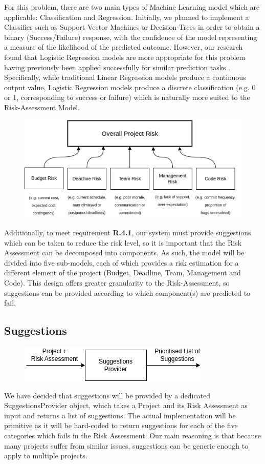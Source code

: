 \documentclass[a4paper]{article}
\theoremstyle{plain}
\theoremstyle{definition}
\theoremstyle{remark}
\begin{document}
\noindent For this problem, there are two main types of Machine Learning model which are applicable: Classification and Regression. Initially, we planned to implement a Classifier such as Support Vector Machines or Decision-Trees in order to obtain a binary (Success/Failure) response, with the confidence of the model representing a measure of the likelihood of the predicted outcome. However, our research found that Logistic Regression models are more appropriate for this problem having previously been applied successfully for similar prediction tasks \cite{billy}. Specifically, while traditional Linear Regression models produce a continuous output value, Logistic Regression models produce a discrete classification (e.g. 0 or 1, corresponding to success or failure) \cite{kanade_2022} which is naturally more suited to the Risk-Assessment Model. \\
\begin{figure}
\includegraphics[width=0.9\linewidth]{cr.png} 	
\end{figure}
Additionally, to meet requirement \textbf{R.4.1}, our system must provide suggestions which can be taken to reduce the risk level, so it is important that the Risk Assessment can be decomposed into components. As such, the model will be divided into five sub-models, each of which provides a risk estimation for a different element of the project (Budget, Deadline, Team, Management and Code). This design offers greater granularity to the Risk-Assessment, so suggestions can be provided according to which component(s) are predicted to fail.
\subsection*{Suggestions}
\begin{figure}
\includegraphics[width=1\linewidth]{arrow.png} 	
\end{figure}
We have decided that suggestions will be provided by a dedicated SuggestionsProvider object, which takes a Project and its Risk Assessment as input and returns a list of suggestions. The actual implementation will be primitive as it will be hard-coded to return suggestions for each of the five categories which fails in the Risk Assessment. Our main reasoning is that because many projects suffer from similar issues, suggestions can be generic enough to apply to multiple projects.
\end{document}
